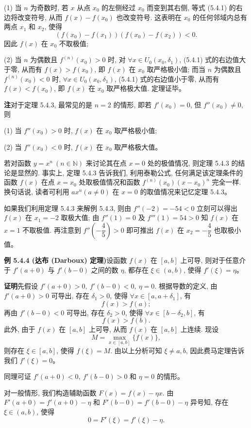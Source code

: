 \documentclass[UTF8,12pt,a4paper,fontset=fandol]{ctexart}
\begin{document}
(1) 当 $n$ 为奇数时, 若 $x$ 从点 $x_0$ 的左侧经过 $x_0$ 而变到其右侧, 等式 (5.4.1) 的右边将改变符号, 从而 $f(x)-f(x_0)$ 也改变符号. 这表明在 $x_0$ 的任何邻域内总有两点 $x_1$ 和 $x_2$, 使得
\[
  (f(x_0)-f(x_1))(f(x_0)-f(x_2))<0.
\]
因此 $f(x)$ 在 $x_0$ 不取极值;

(2) 当 $n$ 为偶数且 $f^{(n)}(x_0)>0$ 时, 对 $\forall x\in U_0(x_0,\delta_1)$, (5.4.1) 式的右边值大于零, 从而有 $f(x)>f(x_0)$, 即 $f(x)$ 在 $x_0$ 取严格极小值; 而当 $n$ 为偶数且 $f^{(n)}(x_0)<0$ 时, $\forall x\in U_0(x_0,\delta_1)$, (5.4.1) 式的右边值小于零, 从而有 $f(x)<f(x_0)$, 即 $f(x)$ 在 $x_0$ 取严格极大值. 定理证毕。

\noindent\textbf{注}\quad 对于定理 5.4.3, 最常见的是 $n=2$ 的情形, 即若 $f'(x_0)=0$, 但 $f''(x_0)\ne0$, 则

(1) 当 $f''(x_0)>0$ 时, $f(x)$ 在 $x_0$ 取严格极小值;

(2) 当 $f''(x_0)<0$ 时, $f(x)$ 在 $x_0$ 取严格极大值。

若对函数 $y=x^n\ (n\in\mathbb{N})$ 来讨论其在点 $x=0$ 处的极值情况, 则定理 5.4.3 的结论是显然的. 事实上, 定理 5.4.3 告诉我们, 利用泰勒公式, 任何满足该定理条件的函数 $f(x)$ 在点 $x=x_0$ 处取极值情况和函数 $f^{(n)}(x_0)(x-x_0)^n$ 完全一样. 换句话说, 读者可利用 $ax^n(a\ne0)$ 在 $x=0$ 的取值情况来记忆定理 5.4.3。

如果我们利用定理 5.4.3 来解例 5.4.3, 则由 $f''(-2)=-54<0$ 立刻可以得出 $f(x)$ 在 $x_1=-2$ 取极大值; 由 $f''(1)=0$ 及 $f'''(1)=54>0$ 知 $f(x)$ 在 $x=1$ 不取极值. 再注意到 $f''\left(-\dfrac45\right)>0$ 即可推出 $f(x)$ 在 $x_2=-\dfrac45$ 也取极小值。

\noindent\textbf{例 5.4.4 (达布 (Darboux) 定理)}\quad 设函数 $f(x)$ 在 $[a,b]$ 上可导, 则对于任意介于 $f'(a+0)$ 与 $f'(b-0)$ 之间的数 $\eta$, 都存在 $\xi\in(a,b)$, 使得 $f'(\xi)=\eta$。

\noindent\textbf{证明}\quad 先假设 $f'(a+0)>0,\ f'(b-0)<0,\ \eta=0$. 根据导数的定义, 由 $f'(a+0)>0$ 可导出, 存在 $\delta_1>0$, 使得 $\forall x\in[a,a+\delta_1]$, 有
\[
  f(x)>f(a);
\]
再由 $f'(b-0)<0$ 可导出, 存在 $\delta_2>0$, 使得 $\forall x\in[b-\delta_2,b]$, 有
\[
  f(x)>f(b).
\]
此外, 由于 $f(x)$ 在 $[a,b]$ 上可导, 从而 $f(x)$ 在 $[a,b]$ 上连续. 现设
\[
  M=\max_{x\in[a,b]}\{f(x)\},
\]
则存在 $\xi\in[a,b]$, 使得 $f(\xi)=M$. 由以上分析可知 $\xi\ne a,b$, 因此费马定理告诉我们 $f'(\xi)=0$。

同理可证 $f'(a+0)<0,\ f'(b-0)>0$ 和 $\eta=0$ 的情形。

对一般情形, 我们构造辅助函数 $F(x)=f(x)-\eta x$. 由 $F'(a+0)=f'(a+0)-\eta$ 和 $F'(b-0)=f'(b-0)-\eta$ 异号知, 存在 $\xi\in(a,b)$, 使得
\[
  0=F'(\xi)=f'(\xi)-\eta.
\]
\end{document}
